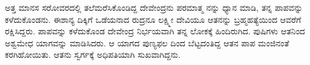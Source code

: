 ಅತ್ತ ಮಾನಸ ಸರೋವರದಲ್ಲಿ ತಲೆಮರೆಸಿಕೊಂಡಿದ್ದ ದೇವೇಂದ್ರನು ಪರಮಾತ್ಮ ನನ್ನು ಧ್ಯಾನ ಮಾಡಿ, ತನ್ನ ಪಾಪವನ್ನು ಕಳೆದುಕೊಂಡನು. ಈಶಾನ್ಯ ದಿಕ್ಕಿಗೆ ಒಡೆಯನಾದ ರುದ್ರನೂ ಲಕ್ಷ್ಮೀ ದೇವಿಯೂ ಆತನನ್ನು ಬ್ರಹ್ಮಹತ್ಯೆಯಿಂದ ಆವರೆಗೆ ರಕ್ಷಿಸಿದ್ದರು. ಪಾಪವನ್ನು ಕಳೆದುಕೊಂಡ ದೇವೇಂದ್ರ ನಿರ್ಭಯವಾಗಿ ತನ್ನ ಲೋಕಕ್ಕೆ ಹಿಂದಿರುಗಿದ. ಪುಷಿಗಳು ಆತನಿಂದ ಅಶ್ವಮೇಧ ಯಾಗವನ್ನು ಮಾಡಿಸಿದರು. ಆ ಯಾಗದ ಪುಣ್ಯಫಲ ದಿಂದ ಬೆಟ್ಟದಂತಿದ್ದ ಆತನ ಪಾಪ ಮಂಜಿನಂತೆ ಕರಗಿಹೋಯಿತು. ಆತನು ಸ್ವರ್ಗಕ್ಕೆ ಅಧಿಪತಿಯಾಗಿ ಸುಖವಾಗಿದ್ದನು.

